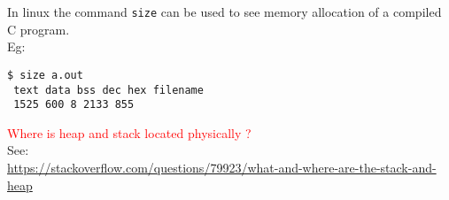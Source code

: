 In linux the command \texttt{size} can be used to see memory allocation of a compiled C program.\\
Eg: 
 
\begin{mdframed}
	\texttt{\$ size a.out}\\
	\texttt{    text	   data	    bss	    dec	    hex	filename}\\
	\texttt{   1525	    600	      8	   2133	    855	}\\
\end{mdframed}

\textcolor{red}{Where is heap and stack located physically ?}\\
See:\\
\url{https://stackoverflow.com/questions/79923/what-and-where-are-the-stack-and-heap}

\begin{tabularx}{\linewidth}{l|X}
	
\end{tabularx}


\vfill \null
\columnbreak

